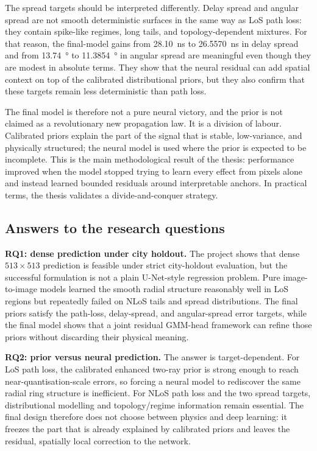 The spread targets should be interpreted differently. Delay spread and angular
spread are not smooth deterministic surfaces in the same way as LoS path loss:
they contain spike-like regimes, long tails, and topology-dependent mixtures.
For that reason, the final-model gains from \SI{28.10}{ns} to \SI{26.5570}{ns} in
delay spread and from \SI{13.74}{\degree} to \SI{11.3854}{\degree} in angular
spread are meaningful even though they are modest in absolute terms. They show
that the neural residual can add spatial context on top of the calibrated
distributional priors, but they also confirm that these targets remain less
deterministic than path loss.

The final model is therefore not a pure neural victory, and the prior is not
claimed as a revolutionary new propagation law. It is a division of labour.
Calibrated priors explain the part of the signal that is stable, low-variance,
and physically structured; the neural model is used where the prior is expected
to be incomplete. This is the main methodological result of the thesis:
performance improved when the model stopped trying to learn every effect from
pixels alone and instead learned bounded residuals around interpretable anchors.
In practical terms, the thesis validates a divide-and-conquer strategy.

\subsection{Answers to the research questions}

\textbf{RQ1: dense prediction under city holdout.} The project shows that dense
\(513\times513\) prediction is feasible under strict city-holdout evaluation,
but the successful formulation is not a plain U-Net-style regression problem.
Pure image-to-image models learned the smooth radial structure reasonably well
in LoS regions but repeatedly failed on NLoS tails and spread distributions.
The final priors satisfy the path-loss, delay-spread, and angular-spread error
targets, while the final model shows that a joint residual GMM-head framework can refine those
priors without discarding their physical meaning.

\textbf{RQ2: prior versus neural prediction.} The answer is target-dependent.
For LoS path loss, the calibrated enhanced two-ray prior is strong enough to
reach near-quantisation-scale errors, so forcing a neural model to rediscover
the same radial ring structure is inefficient. For NLoS path loss and the two
spread targets, distributional modelling and topology/regime information remain
essential. The final design therefore does not choose between physics and deep
learning: it freezes the part that is already explained by calibrated priors
and leaves the residual, spatially local correction to the network.

